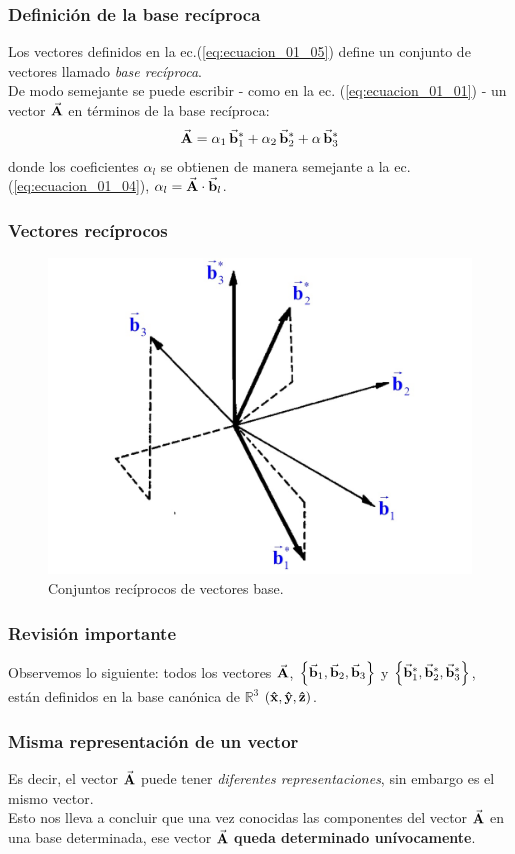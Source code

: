 \documentclass[12pt]{beamer}
\begin{document}
\begin{frame}
\frametitle{Definición de la base recíproca}
Los vectores definidos en la ec.(\ref{eq:ecuacion_01_05}) define un conjunto de vectores llamado \emph{base recíproca}.
\\
\bigskip
\pause
De modo semejante se puede escribir - como en la ec. (\ref{eq:ecuacion_01_01}) - un vector $\va{A}$ en términos de la base recíproca:
\pause
\begin{align}
\va{A} = \alpha_{1} \, \va{b}_{1}^{*} + \alpha_{2} \, \va{b}_{2}^{*} + \alpha \, \va{b}_{3}^{*}
\label{eq:ecuacion_01_06}
\end{align}
\pause
donde los coeficientes $\alpha_{l}$ se obtienen de manera semejante a la ec. (\ref{eq:ecuacion_01_04}), $\alpha_{l} = \va{A} \cdot \va{b}_{l}$.
\end{frame}
\begin{frame}
\frametitle{Vectores recíprocos}
\begin{figure}
    \centering
    \includegraphics[scale=0.325]{Imagenes/Vectores_base_reciproco.jpeg}
    \caption{Conjuntos recíprocos de vectores base.}
\end{figure}
\end{frame}
\begin{frame}
\frametitle{Revisión importante}
Observemos lo siguiente: todos los vectores $\va{A}$, $\left\{ \va{b}_{1}, \va{b}_{2}, \va{b}_{3} \right\}$ y $\left\{ \va{b}_{1}^{*}, \va{b}_{2}^{*}, \va{b}_{3}^{*} \right\}$, están definidos en la base canónica de    $\mathbb{R}^{3}$ $(\vu{x}, \vu{y}, \vu{z})$.
\end{frame}
\begin{frame}
\frametitle{Misma representación de un vector}
Es decir, el vector $\va{A}$ puede tener \emph{diferentes representaciones}, sin embargo es el mismo vector.
\\
\bigskip
\pause
Esto nos lleva a concluir que una vez conocidas las componentes del vector $\va{A}$  en una base determinada, ese vector $\va{A}$ \textbf{queda determinado unívocamente}.
\end{frame}
\end{document}

